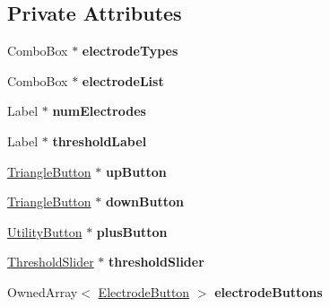 \subsection*{Private Attributes}
\begin{DoxyCompactItemize}
\item 
\hypertarget{classSpikeDetectorEditor_ac7a692b3b6dade3ca922ac81ad71b9b4}{Combo\-Box $\ast$ {\bfseries electrode\-Types}}\label{classSpikeDetectorEditor_ac7a692b3b6dade3ca922ac81ad71b9b4}

\item 
\hypertarget{classSpikeDetectorEditor_aa9f66444c51d8cfce0eb11e3d4bc6b58}{Combo\-Box $\ast$ {\bfseries electrode\-List}}\label{classSpikeDetectorEditor_aa9f66444c51d8cfce0eb11e3d4bc6b58}

\item 
\hypertarget{classSpikeDetectorEditor_a87ba0f2756961e42017a492d60d60ade}{Label $\ast$ {\bfseries num\-Electrodes}}\label{classSpikeDetectorEditor_a87ba0f2756961e42017a492d60d60ade}

\item 
\hypertarget{classSpikeDetectorEditor_a46f1f4b01189fbcd9394bf2ce8c6def7}{Label $\ast$ {\bfseries threshold\-Label}}\label{classSpikeDetectorEditor_a46f1f4b01189fbcd9394bf2ce8c6def7}

\item 
\hypertarget{classSpikeDetectorEditor_a339c5a295cd9fdfeba2ccbb0f2605970}{\hyperlink{classTriangleButton}{Triangle\-Button} $\ast$ {\bfseries up\-Button}}\label{classSpikeDetectorEditor_a339c5a295cd9fdfeba2ccbb0f2605970}

\item 
\hypertarget{classSpikeDetectorEditor_a10ad05b072e42e48fe673faa7ea8dca3}{\hyperlink{classTriangleButton}{Triangle\-Button} $\ast$ {\bfseries down\-Button}}\label{classSpikeDetectorEditor_a10ad05b072e42e48fe673faa7ea8dca3}

\item 
\hypertarget{classSpikeDetectorEditor_a45fe71c4c33361070e7c626186361215}{\hyperlink{classUtilityButton}{Utility\-Button} $\ast$ {\bfseries plus\-Button}}\label{classSpikeDetectorEditor_a45fe71c4c33361070e7c626186361215}

\item 
\hypertarget{classSpikeDetectorEditor_a928b494b0f3e5cf426eed32dbc633006}{\hyperlink{classThresholdSlider}{Threshold\-Slider} $\ast$ {\bfseries threshold\-Slider}}\label{classSpikeDetectorEditor_a928b494b0f3e5cf426eed32dbc633006}

\item 
\hypertarget{classSpikeDetectorEditor_ac1070794a04b6a319796370d50a85008}{Owned\-Array$<$ \hyperlink{classElectrodeButton}{Electrode\-Button} $>$ {\bfseries electrode\-Buttons}}\label{classSpikeDetectorEditor_ac1070794a04b6a319796370d50a85008}


\end{DoxyCompactItemize}
